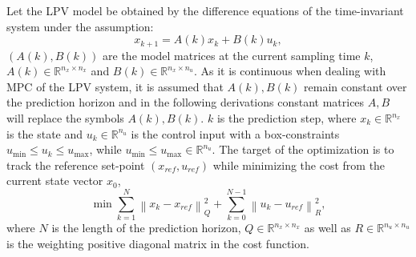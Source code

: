 \documentclass[journal]{IEEEtran}
\begin{document}
Let the LPV model be obtained by the difference equations of the time-invariant system under the assumption:
\begin{equation}\label{mpcmodel}
{x_{k + 1}} = A(k){x_k} + B(k){u_k},
\end{equation}
${(A(k),B(k))}$ are the model matrices at the current sampling time ${k}$, $A(k) \in {\mathbb{R}^{{n_x} \times {n_x}}}$ and $B(k) \in {\mathbb{R}^{{n_x} \times {n_u}}}$. As it is continuous when dealing with MPC of the LPV system, it is assumed that ${A(k),B(k)}$ remain constant over the prediction horizon and in the following derivations constant matrices $A,B$ will replace the symbols $A(k),B(k)$. ${k}$ is the prediction step, where ${x_k} \in {\mathbb{R}^{{n_x}}}$ is  the state and ${u_k} \in {\mathbb{R}^{{n_u}}}$ is the control input with a box-constraints ${u_{\min }} \le {u_k} \le {u_{\max }}$, while ${u_{\min }} \le {u_{\max }} \in {\mathbb{R}^{{n_u}}}$.  The target of the optimization is to track the reference set-point $(x_{ref},u_{ref})$ while minimizing the cost from the current state vector ${x_0}$,
\begin{equation}\label{costf}
\min \sum\limits_{k = 1}^{N} {\left\| {{x_k} - {x_{ref}}} \right\|_Q^2 + } \sum\limits_{k = 0}^{N - 1} {\left\| {{u_k} - {u_{ref}}} \right\|_R^2},
\end{equation}
where $N$ is the length of the prediction horizon, $Q \in {\mathbb{R}^{{n_x} \times {n_x}}}$ as well as $R \in {\mathbb{R}^{{n_u}\times {n_u}}}$ is the weighting positive diagonal matrix in the cost function.
\end{document}
